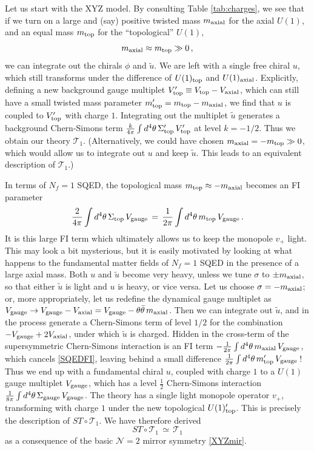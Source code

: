 \documentclass[hyper,letterpaper]{JHEP3}
\numberwithin{equation}{section}
\newcommand{\be}{\begin{equation}}
\newcommand{\ee}{\end{equation}}
\newcommand{\CN}{\mathcal{N}}
\newcommand{\CT}{\mathcal{T}}
\begin{document}
Let us start with the XYZ model. By consulting Table \ref{tab:charges}, we see that if we turn on a large and (say) positive twisted mass $m_{\rm axial}$ for the axial $U(1)$, and an equal mass $m_{\rm top}$ for the ``topological'' $U(1)$,
%
\be m_{\rm axial} \approx m_{\rm top} \gg 0\,, \ee
%
we can integrate out the chirals $\phi$ and $\tilde u$. We are left with a single free chiral $u$, which still transforms under the difference of $U(1)_{\rm top}$ and $U(1)_{\rm axial}$. Explicitly, defining a new background gauge multiplet $V_{\rm top}'\equiv V_{\rm top}-V_{\rm axial}$, which can still have a small twisted mass parameter $m_{\rm top}'=m_{\rm top}-m_{\rm axial}$, we find that $u$ is coupled to $V_{\rm top}'$ with charge $1$. Integrating out the multiplet $\tilde{u}$ generates a background Chern-Simons term $\frac{k}{4\pi}\int d^4\theta\,\Sigma_{\rm top}'\,V_{\rm top}'$ at level $k=-1/2$. Thus we obtain our theory $\CT_1$. (Alternatively, we could have chosen $m_{\rm axial}=-m_{\rm top}\gg 0$, which would allow us to integrate out $u$ and keep $\tilde u$. This leads to an equivalent description of $\CT_1$.)

In terms of $N_f=1$ SQED, the topological mass $m_{\rm top}\approx-m_{\rm axial}$ becomes an FI parameter
%
\be \frac{2}{4\pi}\int d^4\theta\, \Sigma_{\rm top}\,V_{\rm gauge}\,=\, \frac{1}{2\pi}\int d^4\theta\,m_{\rm top}\,V_{\rm gauge}\,. \label{SQEDFI} \ee
%
It is this large FI term which ultimately allows us to keep the monopole $v_+$ light. This may look a bit mysterious, but it is easily motivated by looking at what happens to the fundamental matter fields of $N_f=1$ SQED in the presence of a large axial mass. Both $u$ and $\tilde u$ become very heavy, unless we tune $\sigma$ to $\pm m_{\rm axial}$, so that either $\tilde u$ is light and $u$ is heavy, or vice versa. Let us choose $\sigma=-m_{\rm axial}$; or, more appropriately, let us redefine the dynamical gauge multiplet as $V_{\rm gauge}\to V_{\rm gauge}-V_{\rm axial}=V_{\rm gauge}-\theta\bar\theta\, m_{\rm axial}$. Then we can integrate out $\tilde u$, and in the process generate a Chern-Simons term of level $1/2$ for the combination $-V_{\rm gauge}+2V_{\rm axial}$, under which $\tilde u$ is charged. Hidden in the cross-term of the supersymmetric Chern-Simons interaction is an FI term $-\frac{1}{2\pi}\int d^4\theta\,m_{\rm axial}\,V_{\rm gauge}$, which cancels \eqref{SQEDFI}, leaving behind a small difference $\frac{1}{2\pi}\int d^4\theta\,m_{\rm top}'\,V_{\rm gauge}$\,! Thus we end up with a fundamental chiral $u$, coupled with charge $1$ to a $U(1)$ gauge multiplet $V_{\rm gauge}$, which has a level $\frac12$ Chern-Simons interaction $\frac{1}{8\pi}\int d^4\theta\,\Sigma_{\rm gauge}\,V_{\rm gauge}$. The theory has a single light monopole operator $v_+$, transforming with charge $1$ under the new topological $U(1)_{\rm top}'$. This is precisely the description of $ST\circ \CT_1$. We have therefore derived
%
\be \boxed{ST\circ \CT_1 \,\simeq\, \CT_1} \label{STmir} \ee
%
as a consequence of the basic $\CN=2$ mirror symmetry \eqref{XYZmir}.
\end{document}
